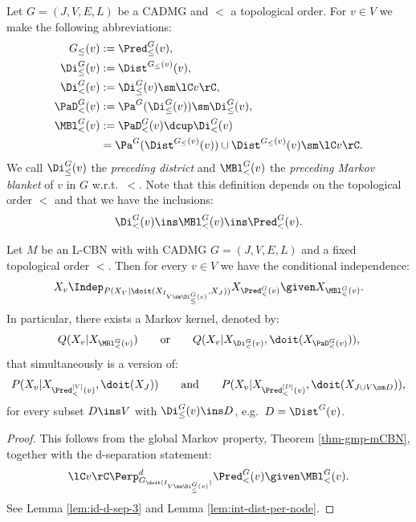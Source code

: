 \begin{Def}
    Let $G=(J,V,E,L)$ be a CADMG and $<$ a topological order.
    For $v \in  V$ we make the following abbreviations:
    \begin{align*}
        G_\le(v) &:= \Pred^G_\le(v), \\%
        \Di^G_\le(v) &:= \Dist^{G_\le(v)}(v),\\%
        \Di^G_<(v) &:= \Di^G_\le(v) \sm \lC v \rC, \\%
        \PaD^G_<(v) &:= \Pa^G(\Di^G_\le(v)) \sm \Di^G_\le(v), \\%
        \MBl^G_<(v) &:= \PaD^G_<(v) \dcup \Di^G_<(v) \\ %
                    &= \Pa^G(\Dist^{G_\le(v)}(v)) \cup \Dist^{G_\le(v)}(v) \sm \lC v \rC.
    \end{align*}
    We call $\Di^G_\le(v)$ the \emph{preceding district} and
    $\MBl^G_<(v)$ the  \emph{preceding Markov blanket} of $v$ in $G$ w.r.t.\ $<$.
    Note that this definition depends on the topological order $<$ and that we have the inclusions: 
    \[\Di^G_<(v) \ins  \MBl^G_<(v) \ins  \Pred_<^G(v).\] 
\end{Def}



\begin{Prp}
    \label{prp:ioLMP}
    Let $M$ be an L-CBN with with \observational CADMG $G=(J,V,E,L)$ and a fixed topological order $<$.
    Then for every $v \in V$ we have the conditional independence:
    \[ X_v \Indep_{P(X_V|\doit(X_{I_{V \sm \Di^G_\le(v)}},X_J))}  X_{\Pred^G_<(v)} \given X_{\MBl^G_<(v)}.\]
    In particular, 
    there exists a Markov kernel, denoted by: 
    \[Q(X_v|X_{\MBl^G_<(v)}) \qquad \text{or} \qquad Q(X_v|X_{\Di^G_<(v)},\doit(X_{\PaD^G_<(v)})), \] 
    that simultaneously is a version of:
    \[ P(X_v|X_{\Pred^{[V]}_<(v)},\doit(X_J)) \qquad \text{and} \qquad P(X_v|X_{\Pred^{[D]}_<(v)},\doit(X_{J \cup V\sm D})),\]
    for every subset $D \ins V$ with $\Di^G_\le(v) \ins D$, e.g.\ $D=\Dist^G(v)$.
    \begin{proof}
        This follows from the global Markov property, Theorem \ref{thm-gmp-mCBN}, together with the d-separation statement:
        \[ \lC v\rC \Perp^d_{ G_{\doit( I_{V \sm \Di^G_\le(v)} )}}  \Pred^G_<(v) \given \MBl^G_<(v).\]
        See Lemma \ref{lem:id-d-sep-3} and Lemma \ref{lem:int-dist-per-node}.
    \end{proof}
\end{Prp}

